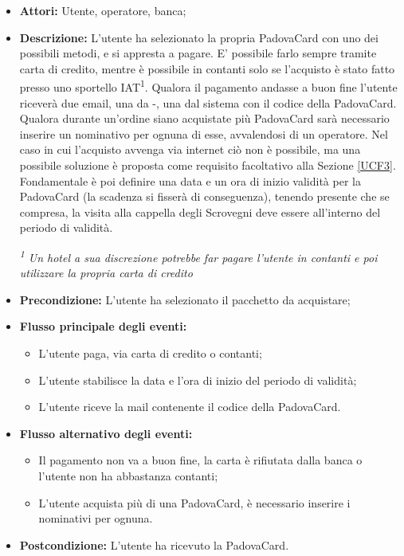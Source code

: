\begin{itemize}
\item \textbf{Attori:} Utente, operatore, banca;
\item \textbf{Descrizione:} L'utente ha selezionato la propria PadovaCard con uno dei possibili metodi, e si appresta a pagare. E' possibile farlo sempre tramite carta di credito, mentre è possibile  in contanti solo se l'acquisto è stato fatto presso uno sportello IAT\textsuperscript{1}. Qualora il pagamento andasse a buon fine l'utente riceverà due email, una da \tlite     -\vivaticket, una dal sistema con il codice della PadovaCard. Qualora durante un'ordine siano acquistate più PadovaCard sarà necessario inserire un nominativo per ognuna di esse, avvalendosi di un operatore. Nel caso in cui l'acquisto avvenga via internet ciò non è possibile, ma una possibile soluzione è proposta come requisito facoltativo alla Sezione \ref{UCF3}.
Fondamentale è poi definire una data e un ora di inizio validità per la PadovaCard (la scadenza si fisserà di conseguenza), tenendo presente che se compresa, la visita alla cappella degli Scrovegni deve essere all'interno del periodo di validità.\\
\begin{footnotesize}
\textit{\textsuperscript{1} Un hotel a sua discrezione potrebbe far pagare l'utente in contanti e poi utilizzare la propria carta di credito}
\end{footnotesize}
\item \textbf{Precondizione:} L'utente ha selezionato il pacchetto da acquistare;
\item \textbf{Flusso principale degli eventi:}
	\begin{itemize}
		\item L'utente paga, via carta di credito o contanti;
        \item L'utente stabilisce la data e l'ora di inizio del periodo di validità;
		\item L'utente riceve la mail contenente il codice della PadovaCard.
	\end{itemize}
    \item \textbf{Flusso alternativo degli eventi:}
	\begin{itemize}
    	\item Il pagamento non va a buon fine, la carta è rifiutata dalla banca o l'utente non ha abbastanza contanti;
		\item L'utente acquista più di una PadovaCard, è necessario inserire i nominativi per ognuna.
	\end{itemize}
\item \textbf{Postcondizione:} L'utente ha ricevuto la PadovaCard.
\end{itemize}

